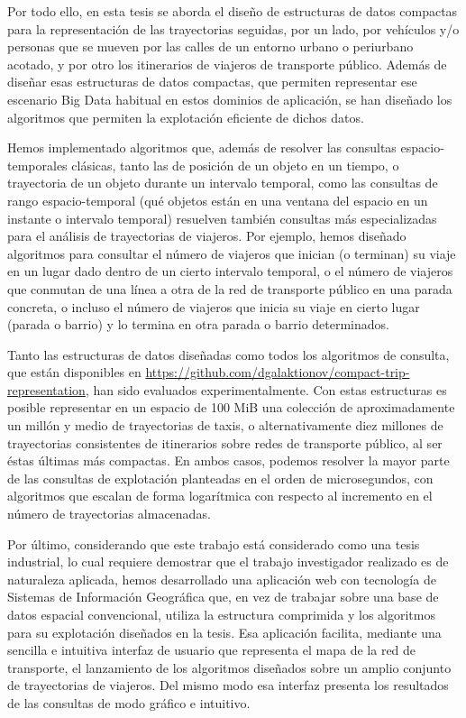 Por todo ello, en esta tesis se aborda el dise\~no de estructuras de datos compactas para la representaci\'on de las trayectorias seguidas, por un lado, por veh\'iculos y/o personas que se mueven por las calles de un entorno urbano o periurbano acotado, y por otro los itinerarios de viajeros de transporte p\'ublico. Adem\'as de dise\~nar esas estructuras de datos compactas, que permiten representar ese escenario Big Data habitual en estos dominios de aplicaci\'on, se han dise\~nado los algoritmos que permiten la explotaci\'on eficiente de dichos datos.

Hemos implementado algoritmos que, adem\'as de resolver las consultas espacio-temporales cl\'asicas, tanto las de posici\'on de un objeto en un tiempo, o trayectoria de un objeto durante un intervalo temporal, como las consultas de rango espacio-temporal (qu\'e objetos est\'an en una ventana del espacio en un instante o intervalo temporal) resuelven tambi\'en consultas m\'as especializadas para el an\'alisis de trayectorias de viajeros. Por ejemplo, hemos dise\~nado algoritmos para  consultar el n\'umero de viajeros que inician (o terminan)  su viaje en un lugar dado dentro de un cierto intervalo temporal, o el n\'umero de viajeros que conmutan de una l\'inea a otra de la red de transporte p\'ublico en una parada concreta, o incluso el n\'umero de viajeros que inicia su viaje en cierto lugar (parada o  barrio) y lo termina en otra parada o barrio determinados. 

Tanto las estructuras de datos dise\~nadas como todos los algoritmos de consulta,  que  est\'an disponibles en \url{https://github.com/dgalaktionov/compact-trip-representation},  han sido evaluados experimentalmente. Con estas estructuras es posible representar en un espacio de 100 MiB una colecci\'on de aproximadamente un mill\'on y medio de trayectorias de taxis, o alternativamente diez millones de trayectorias consistentes de itinerarios sobre redes de transporte p\'ublico, al ser \'estas \'ultimas m\'as compactas. En ambos casos, podemos resolver la mayor parte de las consultas de explotaci\'on planteadas en el orden de microsegundos, con algoritmos que escalan de forma logar\'itmica con respecto al incremento en el n\'umero de trayectorias almacenadas.

Por \'ultimo, considerando que este trabajo est\'a considerado como una tesis industrial, lo cual requiere demostrar que el trabajo investigador realizado es de naturaleza aplicada, hemos desarrollado una aplicaci\'on web con tecnolog\'ia de Sistemas de Informaci\'on Geogr\'afica que, en vez de trabajar sobre una base de datos espacial convencional, utiliza la estructura comprimida y los algoritmos para su explotaci\'on dise\~nados en la tesis. Esa aplicaci\'on facilita, mediante una sencilla e intuitiva interfaz de usuario que representa el mapa de la red de transporte, el lanzamiento de los algoritmos dise\~nados sobre un amplio conjunto de trayectorias de viajeros. Del mismo modo esa interfaz presenta los resultados de las consultas de modo gr\'afico e intuitivo.

